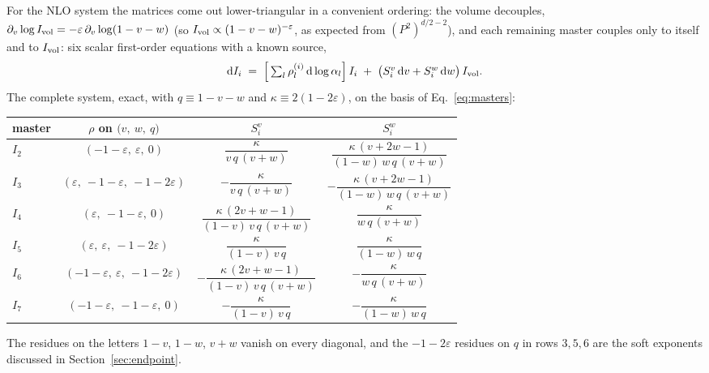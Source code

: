 \documentclass[11pt]{article}
\newcommand{\eps}{\varepsilon}
\newcommand{\dd}{\mathrm{d}}
\begin{document}
For the NLO system the matrices come out lower-triangular in a
convenient ordering: the volume decouples,
$\partial_v \log I_{\rm vol} = -\eps\,\partial_v\log(1-v-w)$
(so $I_{\rm vol} \propto (1-v-w)^{-\eps}$, as expected from
$(P^2)^{d/2-2}$), and each remaining master couples only to itself
and to $I_{\rm vol}$: six scalar first-order equations with a known
source,
\begin{equation}
  \dd I_i \;=\;
  \Big[\textstyle\sum_l \rho^{(i)}_l\, \dd\log \alpha_l\Big]\, I_i
  \;+\; \big(S^v_i\,\dd v + S^w_i\,\dd w\big)\, I_{\rm vol}.
  \label{eq:scalar}
\end{equation}
The complete system, exact, with $q \equiv 1-v-w$ and
$\kappa \equiv 2(1-2\eps)$, on the basis of
Eq.~\eqref{eq:masters}:
\begin{center}
\small
\renewcommand{\arraystretch}{1.4}
\begin{tabular}{lccc}
\toprule
master & $\rho$ on $\big(v,\ w,\ q\big)$ &
$S^v_i$ & $S^w_i$ \\
\midrule
$I_2$ & $(-1{-}\eps,\ \eps,\ 0)$ &
$\dfrac{\kappa}{v\,q\,(v{+}w)}$ &
$\dfrac{\kappa\,(v{+}2w{-}1)}{(1{-}w)\,w\,q\,(v{+}w)}$ \\
$I_3$ & $(\eps,\ -1{-}\eps,\ -1{-}2\eps)$ &
$-\dfrac{\kappa}{v\,q\,(v{+}w)}$ &
$-\dfrac{\kappa\,(v{+}2w{-}1)}{(1{-}w)\,w\,q\,(v{+}w)}$ \\
$I_4$ & $(\eps,\ -1{-}\eps,\ 0)$ &
$\dfrac{\kappa\,(2v{+}w{-}1)}{(1{-}v)\,v\,q\,(v{+}w)}$ &
$\dfrac{\kappa}{w\,q\,(v{+}w)}$ \\
$I_5$ & $(\eps,\ \eps,\ -1{-}2\eps)$ &
$\dfrac{\kappa}{(1{-}v)\,v\,q}$ &
$\dfrac{\kappa}{(1{-}w)\,w\,q}$ \\
$I_6$ & $(-1{-}\eps,\ \eps,\ -1{-}2\eps)$ &
$-\dfrac{\kappa\,(2v{+}w{-}1)}{(1{-}v)\,v\,q\,(v{+}w)}$ &
$-\dfrac{\kappa}{w\,q\,(v{+}w)}$ \\
$I_7$ & $(-1{-}\eps,\ -1{-}\eps,\ 0)$ &
$-\dfrac{\kappa}{(1{-}v)\,v\,q}$ &
$-\dfrac{\kappa}{(1{-}w)\,w\,q}$ \\
\bottomrule
\end{tabular}
\end{center}
The residues on the letters $1{-}v$, $1{-}w$, $v{+}w$ vanish on every
diagonal, and the $-1-2\eps$ residues on $q$ in rows $3,5,6$ are the
soft exponents discussed in Section~\ref{sec:endpoint}.
\end{document}
